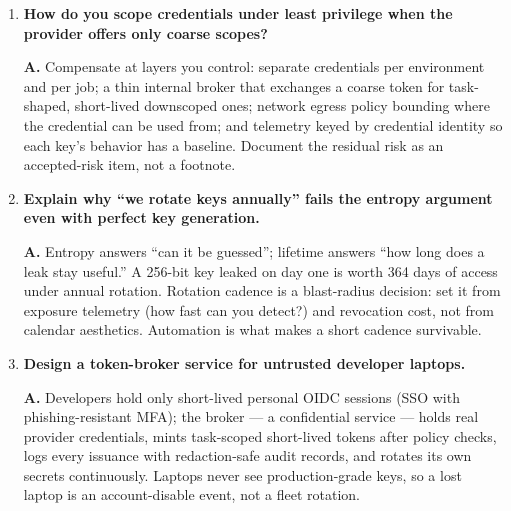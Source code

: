\begin{enumerate}[label=\textbf{Q\arabic*.}, leftmargin=1.7cm, itemsep=0.9em, start=23]
        \textbf{A.} Accept only in a precisely bounded form: reading
        \texttt{iss} or \texttt{kid} \emph{to select} a key from your
        trusted configuration is unavoidable in multi-issuer systems, but
        every claim remains untrusted input until the signature verifies ---
        so the selected key must come from your allow-listed map, the
        algorithm from that key's configuration, and all authorization
        decisions strictly after verification. Routing on unverified claims
        for \emph{trust} decisions (not just key lookup) is the confused
        deputy wearing a routing hat.
  \item \textbf{How do you scope credentials under least privilege when the
        provider offers only coarse scopes?}\par
        \textbf{A.} Compensate at layers you control: separate credentials
        per environment and per job; a thin internal broker that exchanges a
        coarse token for task-shaped, short-lived downscoped ones; network
        egress policy bounding where the credential can be used from; and
        telemetry keyed by credential identity so each key's behavior has a
        baseline. Document the residual risk as an accepted-risk item, not
        a footnote.
  \item \textbf{Explain why ``we rotate keys annually'' fails the entropy
        argument even with perfect key generation.}\par
        \textbf{A.} Entropy answers ``can it be guessed''; lifetime answers
        ``how long does a leak stay useful.'' A 256-bit key leaked on day
        one is worth 364 days of access under annual rotation. Rotation
        cadence is a blast-radius decision: set it from exposure telemetry
        (how fast can you detect?) and revocation cost, not from calendar
        aesthetics. Automation is what makes a short cadence survivable.
  \item \textbf{Design a token-broker service for untrusted developer
        laptops.}\par
        \textbf{A.} Developers hold only short-lived personal OIDC sessions
        (SSO with phishing-resistant MFA); the broker --- a confidential
        service --- holds real provider credentials, mints task-scoped
        short-lived tokens after policy checks, logs every issuance with
        redaction-safe audit records, and rotates its own secrets
        continuously. Laptops never see production-grade keys, so a lost
        laptop is an account-disable event, not a fleet rotation.

\end{enumerate}
